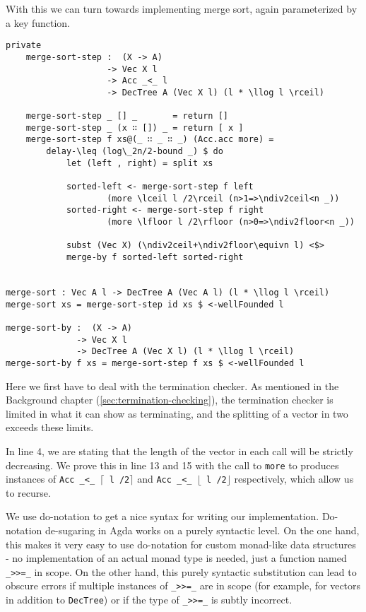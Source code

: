 With this we can turn towards implementing merge sort, again parameterized by a key function.

\begin{lstlisting}[caption={Merge Sort},label={lst:mergesort},emph={DecTree,merge,sort,step,by,recurse,return,delay}]
private
    merge-sort-step :  (X -> A)
                    -> Vec X l
                    -> Acc _<_ l
                    -> DecTree A (Vec X l) (l * \llog l \rceil)

    merge-sort-step _ [] _       = return []
    merge-sort-step _ (x ∷ []) _ = return [ x ]
    merge-sort-step f xs@(_ ∷ _ ∷ _) (Acc.acc more) =
        delay-\leq (log\_2n/2-bound _) $ do
            let (left , right) = split xs

            sorted-left <- merge-sort-step f left
                    (more \lceil l /2\rceil (n>1=>\ndiv2ceil<n _))
            sorted-right <- merge-sort-step f right
                    (more \lfloor l /2\rfloor (n>0=>\ndiv2floor<n _))

            subst (Vec X) (\ndiv2ceil+\ndiv2floor\equivn l) <$>
            merge-by f sorted-left sorted-right


merge-sort : Vec A l -> DecTree A (Vec A l) (l * \llog l \rceil)
merge-sort xs = merge-sort-step id xs $ <-wellFounded l

merge-sort-by :  (X -> A)
              -> Vec X l
              -> DecTree A (Vec X l) (l * \llog l \rceil)
merge-sort-by f xs = merge-sort-step f xs $ <-wellFounded l
\end{lstlisting}

Here we first have to deal with the termination checker. As mentioned in the Background chapter (\autoref{sec:termination-checking}), the termination checker is limited in what it can show as terminating, and the splitting of a vector in two exceeds these limits.

In line 4, we are stating that the length of the vector in each call will be strictly decreasing. We prove this in line 13 and 15 with the call to \texttt{more} to produces instances of \texttt{Acc \_<\_ $\lceil$ l /2$\rceil$} and \texttt{Acc \_<\_ $\lfloor$ l /2$\rfloor$} respectively, which allow us to recurse.

We use do-notation to get a nice syntax for writing our implementation. Do-notation de-sugaring in Agda works on a purely syntactic level. On the one hand, this makes it very easy to use do-notation for custom monad-like data structures - no implementation of an actual monad type is needed, just a function named \texttt{\_>>=\_} in scope. On the other hand, this purely syntactic substitution can lead to obscure errors if multiple instances of \texttt{\_>>=\_} are in scope (for example, for vectors in addition to \texttt{DecTree}) or if the type of \texttt{\_>>=\_} is subtly incorrect.

